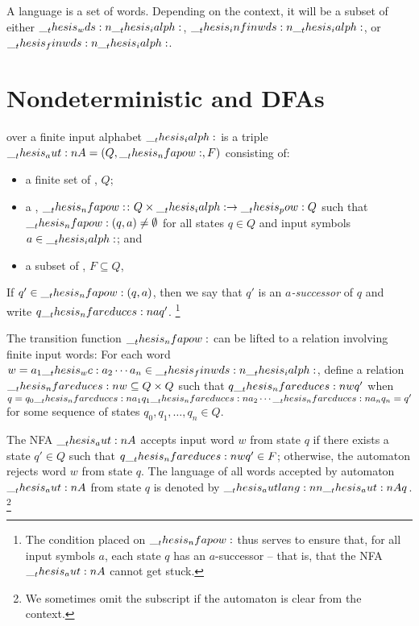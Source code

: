 A language is a set of words.
Depending on the context, it will be a subset of either $\__thesis_wds:n {\__thesis_ialph:}$, $\__thesis_infinwds:n {\__thesis_ialph:}$, or $\__thesis_finwds:n {\__thesis_ialph:}$.




\section{Nondeterministic and \aclp*{DFA}}

\begin{definition}\label{def:finite-automata:nfa}
   over a finite input alphabet $\__thesis_ialph:$ is a triple $\__thesis_aut:n {A} = (Q, \__thesis_nfapow:, F)$ consisting of:
  \begin{itemize}
  \item a finite set of , $Q$;
  \item a , $\__thesis_nfapow:\colon Q \times \__thesis_ialph: \to \__thesis_pow: {Q}$ such that $\__thesis_nfapow:(q, a) \neq \emptyset$ for all states $q \in Q$ and input symbols $a \in \__thesis_ialph:$; and
  \item a subset of , $F \subseteq Q$,
  \end{itemize}
  If $q' \in \__thesis_nfapow:(q, a)$, then we say that $q'$ is an \emph{$a$-successor} of $q$ and write $q \nfareduces[a] q'$.%
  \footnote{The condition placed on $\__thesis_nfapow:$ thus serves to ensure that, for all input symbols $a$, each state $q$ has an $a$-successor -- that is, that the \ac{NFA} $\__thesis_aut:n {A}$ cannot get stuck.}

  The transition function $\__thesis_nfapow:$ can be lifted to a relation involving finite input words: For each word $w = a_1 \wc a_2 \dotsm a_n \in \finwds{\ialph}$, define a relation $\mathord{\nfareduces[\smash{w}]} \subseteq Q \times Q$ such that $q \nfareduces[w] q'$ when $q = q_0 \nfareduces[a_1] q_1 \nfareduces[a_2] \dotsb \nfareduces[a_n] q_n = q'$ for some sequence of states $q_0, q_1, \dotsc, q_n \in Q$.

  The \ac{NFA} $\__thesis_aut:n {A}$ accepts input word $w$ from state $q$ if there exists a state $q' \in Q$ such that $q \nfareduces[w] q' \in F$;
  otherwise, the automaton rejects word $w$ from state $q$.
  The language of all words accepted by automaton $\__thesis_aut:n {A}$ from state $q$ is denoted by $\__thesis_autlang:nn {\__thesis_aut:n {A}} {q}$.%
  \footnote{We sometimes omit the subscript if the automaton is clear from the context.}
\end{definition}

